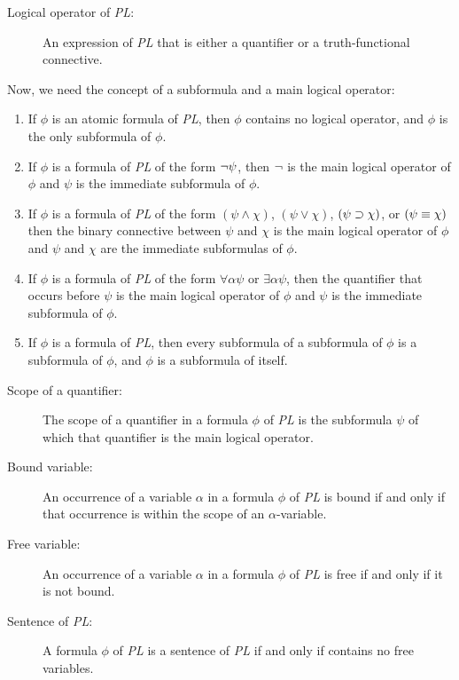 \documentclass[../logic-text.tex]{subfiles}
\begin{document}
\begin{description}
  \item[Logical operator of \emph{PL}:] An expression of \emph{PL} that is either a quantifier or a truth-functional connective. 
\end{description}

Now, we need the concept of a subformula and a main logical operator:

\begin{enumerate}
  \item If \(\phi\) is an atomic formula of \emph{PL}, then \(\phi\) contains no logical operator, and \(\phi\) is the only subformula of \(\phi\).
  \item If \(\phi\) is a formula of \emph{PL} of the form \(\neg \psi\), then \(\neg\) is the main logical operator of \(\phi\) and \(\psi\) is the immediate subformula of \(\phi\).
  \item If \(\phi\) is a formula of \emph{PL} of the form \((\psi \land \chi)\), \((\psi \lor \chi)\), \((\psi \supset \chi)\), or \((\psi \equiv \chi)\) then the binary connective between \(\psi\) and \(\chi\) is the main logical operator of \(\phi\) and \(\psi\) and \(\chi\) are the immediate subformulas of \(\phi\).
  \item If \(\phi\) is a formula of \emph{PL} of the form \(\forall \alpha \psi\) or \(\exists \alpha \psi\), then the quantifier that occurs before \(\psi\) is the main logical operator of \(\phi\) and \(\psi\) is the immediate subformula of \(\phi\).
  \item If \(\phi\) is a formula of \emph{PL}, then every subformula of a subformula of \(\phi\) is a subformula of \(\phi\), and \(\phi\) is a subformula of itself.
\end{enumerate}

\begin{description}
  \item[Scope of a quantifier:] The scope of a quantifier in a formula \(\phi\) of \emph{PL} is the subformula \(\psi\) of which that quantifier is the main logical operator.
  \item[Bound variable:] An occurrence of a variable \(\alpha\) in a formula \(\phi\) of \emph{PL} is bound if and only if that occurrence is within the scope of an \(\alpha\)-variable.
  \item[Free variable:] An occurrence of a variable \(\alpha\) in a formula \(\phi\) of \emph{PL} is free if and only if it is not bound.
  \item[Sentence of \emph{PL}:] A formula \(\phi\) of \emph{PL}  is a sentence of \emph{PL} if and only if contains no free variables.
\end{description}
\end{document}
